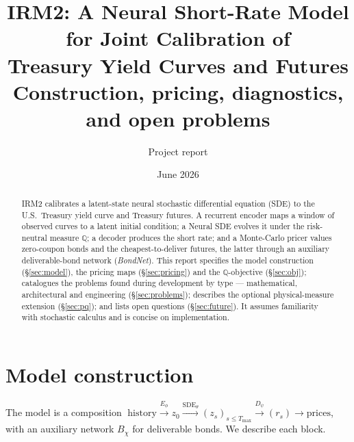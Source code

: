 \documentclass[11pt]{article}
\title{\textbf{IRM2: A Neural Short-Rate Model for Joint Calibration of\\
Treasury Yield Curves and Futures}\\[2pt]
\large Construction, pricing, diagnostics, and open problems}
\author{Project report}
\date{June 2026}
\newcommand{\QQ}{\mathbb{Q}}
\begin{document}
\maketitle

\begin{abstract}
IRM2 calibrates a latent-state neural stochastic differential equation (SDE)
to the U.S.\ Treasury yield curve and Treasury futures. A recurrent encoder
maps a window of observed curves to a latent initial condition; a Neural SDE
evolves it under the risk-neutral measure $\QQ$; a decoder produces the short
rate; and a Monte-Carlo pricer values zero-coupon bonds and the
cheapest-to-deliver futures, the latter through an auxiliary
deliverable-bond network (\emph{BondNet}). This report specifies the model
construction (\S\ref{sec:model}), the pricing maps (\S\ref{sec:pricing}) and
the $\QQ$-objective (\S\ref{sec:obj}); catalogues the problems found during
development by type --- mathematical, architectural and engineering
(\S\ref{sec:problems}); describes the optional physical-measure extension
(\S\ref{sec:pq}); and lists open questions (\S\ref{sec:future}). It assumes
familiarity with stochastic calculus and is concise on implementation.
\end{abstract}

\section{Model construction}\label{sec:model}

The model is a composition $\;\text{history}\xrightarrow{E_\phi} z_0
\xrightarrow{\text{SDE}_\theta} (z_s)_{s\le T_{\max}}
\xrightarrow{D_\psi} (r_s) \to \text{prices}$, with an auxiliary network
$B_\chi$ for deliverable bonds. We describe each block.
\end{document}
